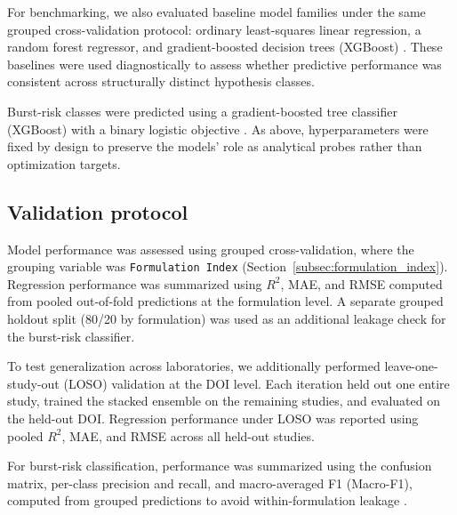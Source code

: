 \documentclass[preprint,12pt,authoryear]{elsarticle}
\begin{document}
For benchmarking, we also evaluated baseline model families under the same grouped cross-validation protocol: ordinary least-squares linear regression, a random forest regressor, and gradient-boosted decision trees (XGBoost) \citep{Breiman2001RF, Chen2016XGBoost}. These baselines were used diagnostically to assess whether predictive performance was consistent across structurally distinct hypothesis classes.

Burst-risk classes were predicted using a gradient-boosted tree classifier (XGBoost) with a binary logistic objective \citep{Chen2016XGBoost}. As above, hyperparameters were fixed by design to preserve the models' role as analytical probes rather than optimization targets.

\subsection{Validation protocol}
Model performance was assessed using grouped cross-validation, where the grouping variable was \texttt{Formulation Index} (Section~\ref{subsec:formulation_index}). Regression performance was summarized using $R^2$, MAE, and RMSE computed from pooled out-of-fold predictions at the formulation level. A separate grouped holdout split (80/20 by formulation) was used as an additional leakage check for the burst-risk classifier.

To test generalization across laboratories, we additionally performed leave-one-study-out (LOSO) validation at the DOI level. Each iteration held out one entire study, trained the stacked ensemble on the remaining studies, and evaluated on the held-out DOI. Regression performance under LOSO was reported using pooled $R^2$, MAE, and RMSE across all held-out studies.

For burst-risk classification, performance was summarized using the confusion matrix, per-class precision and recall, and macro-averaged F1 (Macro-F1), computed from grouped predictions to avoid within-formulation leakage \citep{HeGarcia2009Imbalanced, SokolovaLapalme2009Metrics}.
\end{document}
